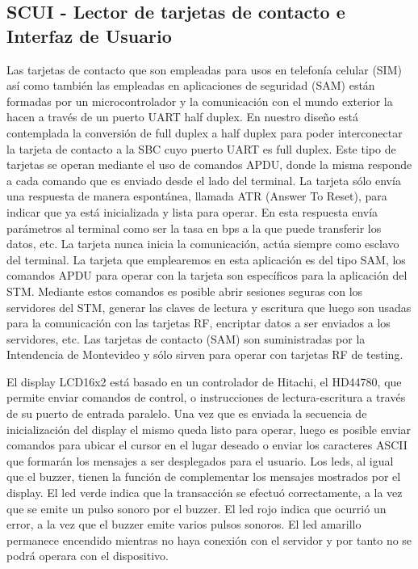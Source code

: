 
\subsection{SCUI - Lector de tarjetas de contacto e Interfaz de Usuario}

Las tarjetas de contacto que son empleadas para usos en telefonía celular (SIM) así
como también las empleadas en aplicaciones de seguridad (SAM) están formadas por
un microcontrolador y la comunicación con el mundo exterior la hacen a través de un
puerto UART half duplex. En nuestro diseño está contemplada la conversión de full
duplex a half duplex para poder interconectar la tarjeta de contacto a la SBC cuyo
puerto UART es full duplex.
Este tipo de tarjetas se operan mediante el uso de comandos APDU, donde la misma
responde a cada comando que es enviado desde el lado del terminal. La tarjeta sólo
envía una respuesta de manera espontánea, llamada ATR (Answer To Reset), para
indicar que ya está inicializada y lista para operar. En esta respuesta envía parámetros
al terminal como ser la tasa en bps a la que puede transferir los datos, etc. La tarjeta
nunca inicia la comunicación, actúa siempre como esclavo del terminal. La tarjeta
que emplearemos en esta aplicación es del tipo SAM, los comandos APDU para
operar con la tarjeta son específicos para la aplicación del STM. Mediante estos
comandos es posible abrir sesiones seguras con los servidores del STM, generar las
claves de lectura y escritura que luego son usadas para la comunicación con las
tarjetas RF, encriptar datos a ser enviados a los servidores, etc.
Las tarjetas de contacto (SAM) son suministradas por la Intendencia de Montevideo
y sólo sirven para operar con tarjetas RF de testing.


El display LCD16x2 está basado en un controlador de Hitachi, el HD44780, que
permite enviar comandos de control, o instrucciones de lectura-escritura a través de
su puerto de entrada paralelo. Una vez que es enviada la secuencia de inicialización
del display el mismo queda listo para operar, luego es posible enviar comandos para
ubicar el cursor en el lugar deseado o enviar los caracteres ASCII que formarán los
mensajes a ser desplegados para el usuario.
Los leds, al igual que el buzzer, tienen la función de complementar los mensajes
mostrados por el display. El led verde indica que la transacción se efectuó
correctamente, a la vez que se emite un pulso sonoro por el buzzer. El led rojo indica
que ocurrió un error, a la vez que el buzzer emite varios pulsos sonoros. El led
amarillo permanece encendido mientras no haya conexión con el servidor y por tanto
no se podrá operara con el dispositivo.

